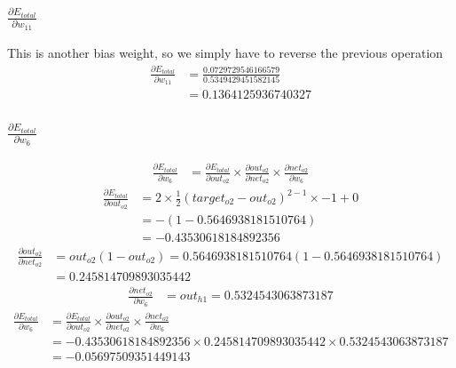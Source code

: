 \documentclass{article}
\begin{document}
\subsubsection{$\frac{\partial E_{total}}{\partial w_{11}}$}
This is another bias weight, so we simply have to reverse the previous operation
\begin{align*}
    \frac{\partial E_{total}}{\partial w_{11}} 
    & = \frac{0.0729729546166579}{0.5349429451582145} \\
    & = 0.1364125936740327
\end{align*}


\subsubsection{$\frac{\partial E_{total}}{\partial w_6}$}

\begin{align*}
    \frac{\partial E_{total}}{\partial w_6} & =
    \frac{\partial E_{total}}{\partial out_{o2}} \times
    \frac{\partial out_{o2}}{\partial net_{o2}} \times
    \frac{\partial net_{o2}}{\partial w_6} 
\end{align*}
\begin{align*}
    \frac{\partial E_{total}}{\partial out_{o2}}
    & = 2 \times \frac{1}{2}(target_{o2} - out_{o2})^{2 - 1} \times -1 + 0 \\
    & = -(1- 0.5646938181510764) \\ & = -0.43530618184892356
\end{align*}
\begin{align*}
    \frac{\partial out_{o2}}{\partial net_{o2}} 
    & = out_{o2}(1 - out_{o2}) = 0.5646938181510764(1- 0.5646938181510764) \\
    & = 0.245814709893035442
\end{align*}
\begin{align*}
    \frac{\partial net_{o2}}{\partial w_6} 
    & = out_{h1} = 0.5324543063873187
\end{align*}
\begin{align*}
    \frac{\partial E_{total}}{\partial w_6} & =
    \frac{\partial E_{total}}{\partial out_{o2}} \times
    \frac{\partial out_{o2}}{\partial net_{o2}} \times
    \frac{\partial net_{o2}}{\partial w_6} \\
    & = -0.43530618184892356 \times 0.245814709893035442 \times 0.5324543063873187 \\
    & = -0.05697509351449143
\end{align*}
\end{document}
